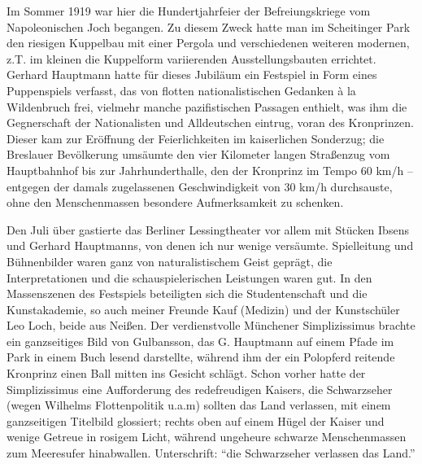 Im Sommer 1919 war hier die Hundertjahrfeier der Befreiungskriege vom Napoleonischen Joch begangen. Zu diesem Zweck hatte man im Scheitinger Park den riesigen Kuppelbau mit einer Pergola und verschiedenen weiteren modernen, z.T. im kleinen die Kuppelform variierenden Ausstellungsbauten errichtet. Gerhard Hauptmann hatte für dieses Jubiläum ein Festspiel in Form eines Puppenspiels verfasst, das von flotten nationalistischen Gedanken à la Wildenbruch frei, vielmehr manche pazifistischen Passagen enthielt, was ihm die Gegnerschaft der Nationalisten und Alldeutschen eintrug, voran des Kronprinzen. Dieser kam zur Eröffnung der Feierlichkeiten im kaiserlichen Sonderzug; die Breslauer Bevölkerung umsäumte den vier Kilometer langen Straßenzug vom Hauptbahnhof bis zur Jahrhunderthalle, den der Kronprinz im Tempo 60 km/h -- entgegen der damals zugelassenen Geschwindigkeit von 30 km/h durchsauste, ohne den Menschenmassen besondere Aufmerksamkeit zu schenken.

Den Juli über gastierte das Berliner Lessingtheater vor allem mit Stücken Ibsens und Gerhard Hauptmanns, von denen ich nur wenige versäumte. Spielleitung und Bühnenbilder waren ganz von naturalistischem Geist geprägt, die Interpretationen und die schauspielerischen Leistungen waren gut. In den Massenszenen des Festspiels beteiligten sich die Studentenschaft und die Kunstakademie, so auch meiner Freunde Kauf (Medizin) und der Kunstschüler Leo Loch, beide aus Neißen. Der verdienstvolle Münchener Simplizissimus brachte ein ganzseitiges Bild von Gulbansson, das G. Hauptmann auf einem Pfade im Park in einem Buch lesend darstellte, während ihm der ein Polopferd reitende Kronprinz einen Ball mitten ins Gesicht schlägt. Schon vorher hatte der Simplizissimus eine Aufforderung des redefreudigen Kaisers, die Schwarzseher (wegen Wilhelms Flottenpolitik u.a.m) sollten das Land verlassen, mit einem ganzseitigen Titelbild glossiert; rechts oben auf einem Hügel der Kaiser und wenige Getreue in rosigem Licht, während ungeheure schwarze Menschenmassen zum Meeresufer hinabwallen. Unterschrift: \enquote{die Schwarzseher verlassen das Land.}

